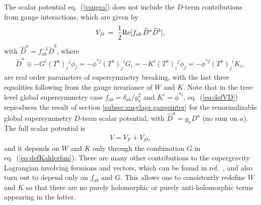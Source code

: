 \documentclass[11pt]{article}
\def\beq{\begin{eqnarray}}
\def\eeq{\end{eqnarray}}
\begin{document}
The scalar potential eq.~(\ref{vsugra}) does not include the $D$-term 
contributions from gauge interactions, which are given by
\beq
V_D \>=\> {1\over 2}{\rm Re}[f_{ab}\, {\widehat D}^a {\widehat 
D}^b],
\label{eq:defVD}
\eeq
with $\widehat D^a = f_{ab}^{-1} \widetilde D^b$, where 
\beq
{\widetilde D}^a \equiv 
-G^i (T^a)_i{}^j \phi_j = -\phi^{*j} (T^a)_j{}^i G_i =
-K^i (T^a)_i{}^j \phi_j = -\phi^{*j} (T^a)_j{}^i K_i, 
\eeq
are real order parameters of supersymmetry breaking, with the last three 
equalities following from the gauge invariance of $W$ and $K$. 
Note that in the tree-level global supersymmetry case $f_{ab} = 
\delta_{ab}/g_a^2$ and $K^i = \phi^{*i}$, eq.~(\ref{eq:defVD}) reproduces 
the result of section \ref{subsec:susylagr.gaugeinter} for the 
renormalizable global supersymmetry $D$-term scalar potential, with 
$\widehat{D}^a = g_a D^a$ (no sum on $a$).
The full scalar 
potential is
\beq
V = V_F + V_D,
\eeq
and it depends on $W$ and $K$ only through the combination $G$ in 
eq.~(\ref{eq:defKahlerfun}). There are many other contributions to the 
supergravity Lagrangian involving fermions and vectors, which 
can be found in 
ref.~\cite{supergravity,superconformalsupergravity}, and
also turn 
out to depend 
only on $f_{ab}$ and 
$G$. This allows one 
to consistently 
redefine $W$ and $K$ so that there are no purely holomorphic or purely 
anti-holomorphic terms appearing in the latter.
\end{document}
